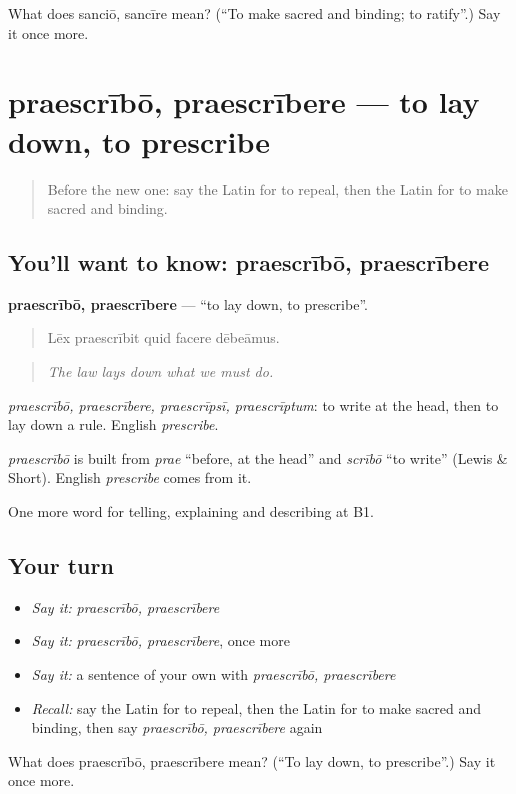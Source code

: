 \begin{tcolorbox}[breakable,colback=teal!4,colframe=teal!35!black,title={Before you move on}]
What does sanciō, sancīre mean? (\textquotedblleft{}To make sacred and binding; to ratify\textquotedblright{}.) Say it once more.
\end{tcolorbox}
\section[praescrībō, praescrībere]{praescrībō, praescrībere — to lay down, to prescribe}

\label{lesson:LA-C410-praescribo}



\begin{quote}
Before the new one: say the Latin for to repeal, then the Latin for to make sacred and binding.
\end{quote}

\subsection*{You'll want to know: praescrībō, praescrībere}
\textbf{praescrībō, praescrībere} — \textquotedblleft{}to lay down, to prescribe\textquotedblright{}.

\begin{quote}
Lēx praescrībit quid facere dēbeāmus.
\end{quote}

\begin{quote}
\emph{The law lays down what we must do.}
\end{quote}

\emph{praescrībō, praescrībere, praescrīpsī, praescrīptum}: to write at the head, then to lay down a rule. English \emph{prescribe}.

\begin{cousinweb}
\emph{praescrībō} is built from \emph{prae} \textquotedblleft{}before, at the head\textquotedblright{} and \emph{scrībō} \textquotedblleft{}to write\textquotedblright{} (Lewis \& Short). English \emph{prescribe} comes from it.
\end{cousinweb}

\begin{grammarlens}[title={What you've built}]
One more word for telling, explaining and describing at B1.
\end{grammarlens}

\subsection*{Your turn}
\begin{itemize}
\raggedright
  \item \emph{Say it:} \emph{praescrībō, praescrībere}
  \item \emph{Say it:} \emph{praescrībō, praescrībere}, once more
  \item \emph{Say it:} a sentence of your own with \emph{praescrībō, praescrībere}
  \item \emph{Recall:} say the Latin for to repeal, then the Latin for to make sacred and binding, then say \emph{praescrībō, praescrībere} again
\end{itemize}

\begin{tcolorbox}[breakable,colback=teal!4,colframe=teal!35!black,title={Before you move on}]
What does praescrībō, praescrībere mean? (\textquotedblleft{}To lay down, to prescribe\textquotedblright{}.) Say it once more.
\end{tcolorbox}

